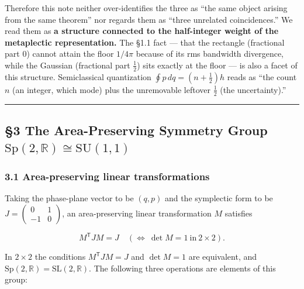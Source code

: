 \documentclass[
]{article}
\begin{document}
Therefore this note neither over-identifies the three as ``the same
object arising from the same theorem'' nor regards them as ``three
unrelated coincidences.'' We read them as \textbf{a structure connected
to the half-integer weight of the metaplectic representation.} The §1.1
fact --- that the rectangle (fractional part \(0\)) cannot attain the
floor \(1/4\pi\) because of its rms bandwidth divergence, while the
Gaussian (fractional part \(\tfrac12\)) sits exactly at the floor --- is
also a facet of this structure. Semiclassical quantization
\(\oint p\,dq=(n+\tfrac12)h\) reads as ``the count \(n\) (an integer,
which mode) plus the unremovable leftover \(\tfrac12\) (the
uncertainty).''

\begin{center}\rule{0.5\linewidth}{0.5pt}\end{center}

\subsection{\texorpdfstring{§3 The Area-Preserving Symmetry Group
\(\mathrm{Sp}(2,\mathbb{R})\cong\mathrm{SU}(1,1)\)}{§3 The Area-Preserving Symmetry Group \textbackslash mathrm\{Sp\}(2,\textbackslash mathbb\{R\})\textbackslash cong\textbackslash mathrm\{SU\}(1,1)}}\label{the-area-preserving-symmetry-group-mathrmsp2mathbbrcongmathrmsu11}

\subsubsection{3.1 Area-preserving linear
transformations}\label{area-preserving-linear-transformations}

Taking the phase-plane vector to be \((q,p)\) and the symplectic form to
be \(J=\begin{pmatrix}0&1\\-1&0\end{pmatrix}\), an area-preserving
linear transformation \(M\) satisfies

\[M^{\mathsf T}JM=J\quad(\Longleftrightarrow\ \det M=1\ \text{in}\ 2\times2).\]

In \(2\times2\) the conditions \(M^{\mathsf T}JM=J\) and \(\det M=1\)
are equivalent, and
\(\mathrm{Sp}(2,\mathbb{R})=\mathrm{SL}(2,\mathbb{R})\). The following
three operations are elements of this group:
\end{document}
